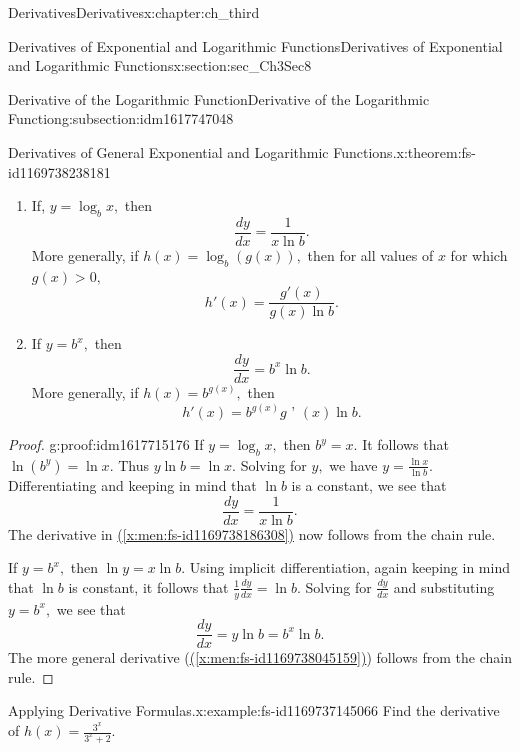 \documentclass[oneside,10pt,]{book}
\newcommand{\xreffont}{\relax}
\numberwithin{equation}{section}
\newcommand{\gt}{>}
\begin{document}
\begin{chapterptx}{Derivatives}{}{Derivatives}{}{}{x:chapter:ch_third}
\begin{sectionptx}{Derivatives of Exponential and Logarithmic Functions}{}{Derivatives of Exponential and Logarithmic Functions}{}{}{x:section:sec_Ch3Sec8}
\begin{subsectionptx}{Derivative of the Logarithmic Function}{}{Derivative of the Logarithmic Function}{}{}{g:subsection:idm1617747048}
\begin{theorem}{Derivatives of General Exponential and Logarithmic Functions.}{}{x:theorem:fs-id1169738238181}
%
\begin{enumerate}
\item{}If, \(y=\log_bx,\) then%
\begin{equation}
\frac{dy}{dx}=\frac{1}{x \ln  b}.\label{g:men:idm1617719144}
\end{equation}
More generally, if \(h(x)=\log_b(g(x)),\) then for all values of \(x\) for which \(g(x)\gt 0,\)%
\begin{equation}
h'(x)=\frac{g'(x)}{g(x) \ln  b}.\label{x:men:fs-id1169738186308}
\end{equation}
%
\item{}If \(y=b^x,\) then%
\begin{equation}
\frac{dy}{dx}=b^x\ln  b.\label{g:men:idm1617721192}
\end{equation}
More generally, if \(h(x)=b^{g(x)},\) then%
\begin{equation}
h'(x)=b^{g(x)}g\text{ ' }(x) \ln  b.\label{x:men:fs-id1169738045159}
\end{equation}
%
\end{enumerate}
\end{theorem}
\begin{proof}{}{g:proof:idm1617715176}
If \(y=\log_bx,\) then \(b^y=x.\) It follows that \(\ln  (b^y)=\ln  x.\) Thus \(y \ln  b=\ln  x.\) Solving for \(y,\) we have \(y=\frac{\ln  x}{\ln  b}.\) Differentiating and keeping in mind that \(\ln  b\) is a constant, we see that%
%
\begin{equation*}
\frac{dy}{dx}=\frac{1}{x \ln  b}.
\end{equation*}
The derivative in \hyperref[x:men:fs-id1169738186308]{({\xreffont\ref{x:men:fs-id1169738186308}})} now follows from the chain rule.%
\par
If \(y=b^x,\) then \(\ln  y=x \ln  b.\) Using implicit differentiation, again keeping in mind that \(\ln  b\) is constant, it follows that \(\frac{1}{y} \frac{dy}{dx}=\ln  b.\) Solving for \(\frac{dy}{dx}\) and substituting \(y=b^x,\) we see that%
%
\begin{equation*}
\frac{dy}{dx}=y \ln  b=b^x\ln  b.
\end{equation*}
The more general derivative (\hyperref[x:men:fs-id1169738045159]{({\xreffont\ref{x:men:fs-id1169738045159}})}) follows from the chain rule.%
\end{proof}
\begin{example}{Applying Derivative Formulas.}{x:example:fs-id1169737145066}%
Find the derivative of \(h(x)=\frac{3^x}{3^x+2}.\)%
\par\smallskip%

\end{example}
\end{subsectionptx}
\end{sectionptx}
\end{chapterptx}
\end{document}
